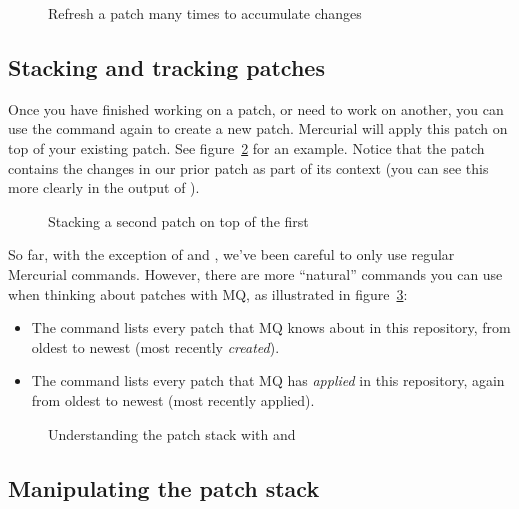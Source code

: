 \begin{figure}[ht]
  \caption{Refresh a patch many times to accumulate changes}
  \label{ex:mq:qrefresh2}
\end{figure}

\subsection{Stacking and tracking patches}

Once you have finished working on a patch, or need to work on another,
you can use the  command again to create a new patch.
Mercurial will apply this patch on top of your existing patch.  See
figure~\ref{ex:mq:qnew2} for an example.  Notice that the patch
contains the changes in our prior patch as part of its context (you
can see this more clearly in the output of ).

\begin{figure}[ht]
  \caption{Stacking a second patch on top of the first}
  \label{ex:mq:qnew2}
\end{figure}

So far, with the exception of  and , we've
been careful to only use regular Mercurial commands.  However, there
are more ``natural'' commands you can use when thinking about patches
with MQ, as illustrated in figure~\ref{ex:mq:qseries}:

\begin{itemize}
\item The  command lists every patch that MQ knows
  about in this repository, from oldest to newest (most recently
  \emph{created}).
\item The  command lists every patch that MQ has
  \emph{applied} in this repository, again from oldest to newest (most
  recently applied).
\end{itemize}

\begin{figure}[ht]
  \caption{Understanding the patch stack with  and
    }
  \label{ex:mq:qseries}
\end{figure}

\subsection{Manipulating the patch stack}

